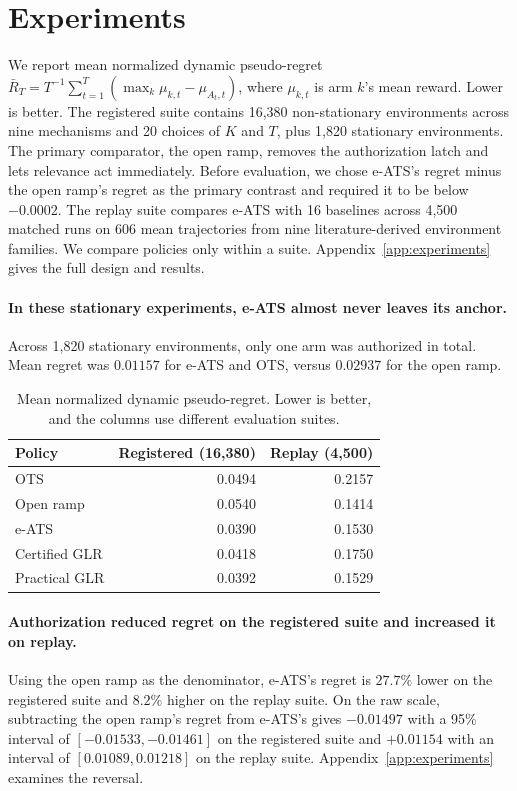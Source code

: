 \documentclass{article}
\newcommand{\method}{e-ATS}
\newcommand{\anchor}{OTS}
\newcommand{\1}{\mathbf 1}
\begin{document}
\section{Experiments}
\label{sec:experiments}

We report mean normalized dynamic pseudo-regret
$\bar R_T=T^{-1}\sum_{t=1}^T(\max_k\mu_{k,t}-\mu_{A_t,t})$, where
$\mu_{k,t}$ is arm $k$'s mean reward. Lower is better. The registered suite
contains 16,380 non-stationary environments across nine mechanisms and 20
choices of $K$ and $T$, plus 1,820 stationary environments. The primary
comparator, the open ramp, removes the authorization latch and lets relevance
act immediately.
Before evaluation, we chose \method{}'s regret minus the open ramp's regret
as the primary contrast and required it to be below $-0.0002$.
The replay suite compares \method{} with 16 baselines across 4,500
matched runs on 606 mean trajectories from nine literature-derived
environment families.
We compare policies only within a suite.
Appendix~\ref{app:experiments} gives the full design and results.

\paragraph{In these stationary experiments, \method{} almost never leaves its anchor.}
Across 1,820 stationary environments, only one arm was authorized in total.
Mean regret was $0.01157$ for \method{} and \anchor{}, versus $0.02937$ for the
open ramp.

\begin{table}[H]
\centering
\small
\caption{Mean normalized dynamic pseudo-regret. Lower is better, and the
columns use different evaluation suites.}
\label{tab:primary-regret}
\begin{tabular}{@{}lrr@{}}
\toprule
Policy & Registered (16,380) & Replay (4,500) \\
\midrule
\anchor{}       & 0.0494 & 0.2157 \\
Open ramp     & 0.0540 & 0.1414 \\
\method{}     & 0.0390 & 0.1530 \\
Certified GLR & 0.0418 & 0.1750 \\
Practical GLR & 0.0392 & 0.1529 \\
\bottomrule
\end{tabular}
\end{table}

\paragraph{Authorization reduced regret on the registered suite and increased it on replay.}
Using the open ramp as the denominator, \method{}'s regret is $27.7\%$ lower on
the registered suite and $8.2\%$ higher on the replay suite. On the raw scale,
subtracting the open ramp's regret from \method{}'s gives $-0.01497$ with a 95\% interval of
$[-0.01533,-0.01461]$ on the registered suite and $+0.01154$ with an
interval of $[0.01089,0.01218]$ on the replay suite.
Appendix~\ref{app:experiments} examines the reversal.
\end{document}
